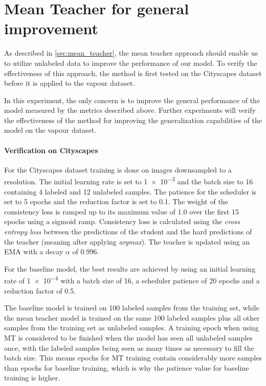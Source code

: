 \section{Mean Teacher for general improvement}
\label{sec:mean_teacher_general}

As described in \ref{sec:mean_teacher}, the mean teacher approach should enable us to utilize unlabeled data to improve the performance of our model.
To verify the effectiveness of this approach, the method is first tested on the Cityscapes dataset before it is applied to the vapour dataset.

In this experiment, the only concern is to improve the general performance of the model measured by the metrics described above. 
Further experiments will verify the effectiveness of the method for improving the generalization capabilities of the model on the vapour dataset.

\paragraph{Verification on Cityscapes} 

For the Cityscapes dataset training is done on images downsampled to a  resolution. The initial learning rate is set to \num{1e-3} and the batch size to 16 containing 4 labeled and 12 unlabeled samples. The patience for the scheduler is set to 5 epochs and the reduction factor is set to \num{0.1}.
The weight of the consistency loss is ramped up to its maximum value of \num{1.0} over the first 15 epochs using a sigmoid ramp.
Consistency loss is calculated using the \emph{cross entropy loss} between the predictions of the student and the hard predictions of the teacher (meaning after applying \emph{argmax}).
The teacher is updated using an EMA with a decay $\alpha$ of \num{0.996}.

For the baseline model, the best results are achieved by using an initial learning rate of \num{1e-4} with a batch size of 16, a scheduler patience of 20 epochs and a reduction factor of \num{0.5}. 

The baseline model is trained on 100 labeled samples from the training set, while the mean teacher model is trained on the same 100 labeled samples plus all other samples from the training set as unlabeled samples.
A training epoch when using MT is considered to be finished when the model has seen all unlabeled samples once, with the labeled samples being seen as many times as necessary to fill the batch size. This means epochs for MT training contain considerably more samples than epochs for baseline training, which is why the patience value for baseline training is higher.

